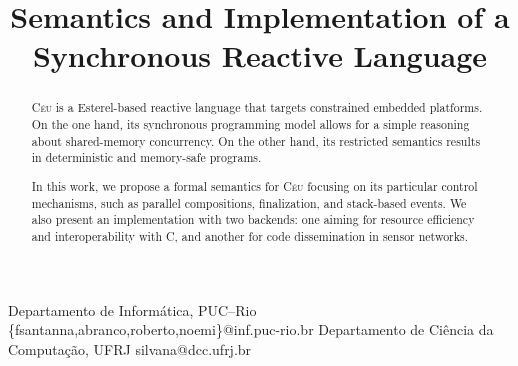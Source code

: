 \documentclass{sigplanconf}
\newcommand{\CEU}{\textsc{C\'{e}u}\xspace}
\newcommand{\1}{\;}
\newcommand{\2}{\;\;}
\newcommand{\3}{\;\;\;}
\newcommand{\5}{\;\;\;\;\;}
\begin{document}
\setlength{\pdfpageheight}{\paperheight}
\setlength{\pdfpagewidth}{\paperwidth}






\title{Semantics and Implementation of a Synchronous Reactive Language}

           {Departamento de Inform\'atica, PUC--Rio}
           {\{fsantanna,abranco,roberto,noemi\}@inf.puc-rio.br}
           {Departamento de Ci\^encia da Computa\c{c}\~ao, UFRJ}
           {silvana@dcc.ufrj.br}

\maketitle

\begin{abstract}

\CEU is a Esterel-based reactive language that targets constrained embedded 
platforms.
%
On the one hand, its synchronous programming model allows for a simple 
reasoning about shared-memory concurrency.
On the other hand, its restricted semantics results in deterministic and 
memory-safe programs.

In this work, we propose a formal semantics for \CEU focusing on its particular 
control mechanisms, such as parallel compositions, finalization, and 
stack-based events.
%
We also present an implementation with two backends:
one aiming for resource efficiency and interoperability with C, and another for 
code dissemination in sensor networks.
\end{abstract}
\end{document}
